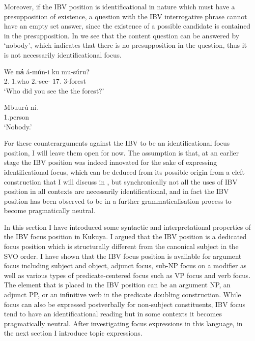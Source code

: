 \documentclass[output=paper,colorlinks,citecolor=brown,
]{langscibook}
\begin{document}
Moreover, if the IBV position is identificational in nature which must have a presupposition of existence, a question with the IBV interrogative phrase cannot have an empty set answer, since the existence of a possible candidate is contained in the presupposition. In  we see that the content question can be answered by `nobody', which indicates that there is no presupposition in the question, thus it is not necessarily identificational focus.
\begin{exe}
    \ex \label{87}
    \begin{xlist}
\ex
\label{87a}
\gll
We \textbf{ná} á-mún-i ku mu-súru?\\
2\Sg{}.\Pro{} 1.who 2\Sg{}.\Pst{}-see-\Pst{} 17.\Loc{} 3-forest\\
\trans ‘Who did you see the the forest?’

\ex
\label{87b}
\gll
Mbuurú ni.\\
1.person \Neg{}\\
\trans ‘Nobody.’

    \end{xlist}
\end{exe}
For these counterarguments against the IBV to be an identificational focus position, I will leave them open for now. The assumption is that, at an earlier stage the IBV position was indeed innovated for the sake of expressing identificational focus, which can be deduced from its possible origin from a cleft construction that I will discuss in , but synchronically not all the uses of IBV position in all contexts are necessarily identificational, and in fact the IBV position has been observed to be in a further grammaticalisation process to become pragmatically neutral.


In this section I have introduced some syntactic and interpretational properties of the IBV focus position in Kukuya. I argued that the IBV position is a dedicated focus position which is structurally different from the canonical subject in the SVO order. I have shown that the IBV focus position is available for argument focus including subject and object, adjunct focus, sub-NP focus on a modifier as well as various types of predicate-centered focus such as VP focus and verb focus. The element that is placed in the IBV position can be an argument NP, an adjunct PP, or an infinitive verb in the predicate doubling construction. While focus can also be expressed postverbally for non-subject constituents, IBV focus tend to have an identificational reading but in some contexts it becomes pragmatically neutral. After investigating focus expressions in this language, in the next section I introduce topic expressions.
\end{document}
